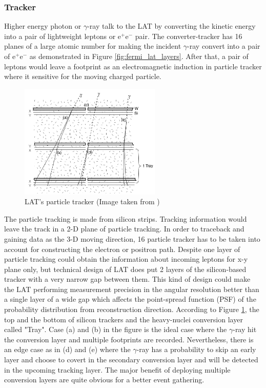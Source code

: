 \subsubsection{Tracker}
Higher energy photon or $\gamma$-ray talk to the LAT by converting the
kinetic energy into a pair of lightweight leptons or e$^{+}$e$^{-}$ pair.
The converter-tracker has 16 planes of a large atomic number for 
making the incident $\gamma$-ray convert into a pair of e$^{+}$e$^{-}$
as demonstrated in Figure \ref{fig:fermi_lat_layers}. After that, 
a pair of leptons would leave a footprint as an electromagnetic induction 
in particle tracker where it sensitive for the moving charged particle.

\begin{figure}[h!]
    \centering
    \includegraphics[width=0.6\textwidth]{content/background/figures/fermi_tracker.png}
    \caption{LAT's particle tracker (Image taken from \cite{FermiLAT})}
    \label{fig:fermi_tracker}
\end{figure}

The particle tracking is made from silicon strips. Tracking information 
would leave the track in a 2-D plane of particle tracking. In order to
traceback and gaining data as the 3-D moving direction, 16 particle 
tracker has to be taken into account for constructing the electron 
or positron path.
Despite one layer of particle tracking could obtain 
the information about incoming leptons for x-y plane only, but technical 
design of LAT does put 2 layers of the silicon-based tracker with a very 
narrow gap between them. This kind of design could make the LAT performing 
measurement precision in the angular resolution better than a single 
layer of a wide gap which affects the point-spread function (PSF)
of the probability distribution from reconstruction direction.
According to Figure \ref{fig:fermi_tracker}, the top and the bottom of
silicon trackers and the heavy-nuclei conversion layer called "Tray".
Case (a) and (b) in the figure is the ideal case where the $\gamma$-ray
hit the conversion layer and multiple footprints are recorded.
Nevertheless, there is an edge case as in (d) and (e) where the $\gamma$-ray
has a probability to skip an early layer and choose to covert in the 
secondary conversion layer and will be detected in the upcoming 
tracking layer. The major benefit of deploying multiple conversion 
layers are quite obvious for a better event gathering.


